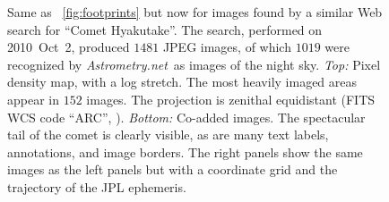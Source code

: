 \documentclass[12pt,preprint]{aastex}
\newcommand{\project}[1]{\textsl{#1}}
\newcommand{\An}{\project{Astrometry.net}}
\newcommand{\figref}[1]{\figurename~\ref{#1}}
\begin{document}
\begin{figure}
\begin{center}
\end{center}
\caption[hya]{Same as \figref{fig:footprints} but now for
  images found by a similar Web search for ``Comet Hyakutake''.  The
  search, performed on 2010~Oct~2, produced $1481$ JPEG images, of
  which $1019$ were recognized by \An\ as images of the night sky.
  \textsl{Top:} Pixel density map, with a log stretch.  The most
  heavily imaged areas appear in $152$ images.  The projection is
  zenithal equidistant (FITS WCS code ``ARC'', \citealt{wcsstandard}).
  \textsl{Bottom:} Co-added images.  The spectacular tail of the comet
  is clearly visible, as are many text labels, annotations, and image
  borders.  The right panels show the same images as the left panels
  but with a coordinate grid and the trajectory of the JPL ephemeris.
  \label{fig:hyakutake}}
\end{figure}

\end{document}
